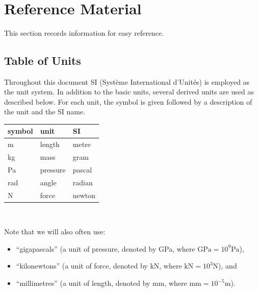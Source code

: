 \documentclass[12pt]{article}
\begin{document}
~\newpage


\section{Reference Material}

This section records information for easy reference.

\subsection{Table of Units}

Throughout this document SI (Syst\`{e}me International d'Unit\'{e}s) is employed
as the unit system.  In addition to the basic units, several derived units are
used as described below.  For each unit, the symbol is given followed by a
description of the unit and the SI name. ~\newline

\begin{center}
    \renewcommand{\arraystretch}{1.2}
    \noindent \begin{tabular}{l l l}
        \toprule
        \textbf{symbol} & \textbf{unit} & \textbf{SI} \\
        \midrule
        \si{\metre}     & length        & metre       \\
        \si{\kilo\gram} & mass          & gram        \\
        \si{\pascal}    & pressure      & pascal      \\
        \si{\radian}    & angle         & radian      \\
        \si{\newton}    & force         & newton      \\
        \bottomrule
    \end{tabular}\\
\end{center}

\noindent{}Note that we will also often use:

\begin{itemize}

    \item ``gigapascals'' (a unit of pressure, denoted by \si{\giga\pascal},
          where \(\si{\giga\pascal}=10^{9}\si{\pascal}\)),

    \item ``kilonewtons'' (a unit of force, denoted by \si{\kilo\newton}, where
          \(\si{\kilo\newton}=10^{3}\si{\newton}\)), and

    \item ``millimetres'' (a unit of length, denoted by \si{\milli\metre}, where
          \(\si{\milli\metre}=10^{-5}\si{\metre}\)).

\end{itemize}
\end{document}
